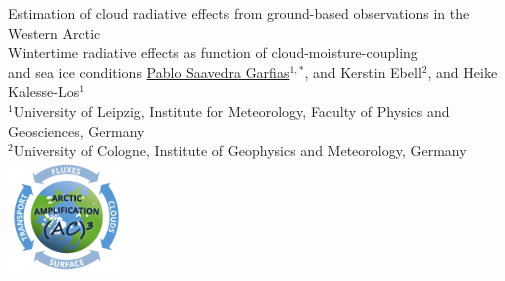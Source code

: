 \documentclass[portrate,paperwidth=841mm,paperheight=1189mm,fontscale=0.4,margin=1cm]{baposter}
\begin{document}
\begin{poster}
{      %
  }
  {\color{black}Estimation of cloud radiative effects from ground-based observations in the Western Arctic\\
  {\vspace{0.4em}\LARGE Wintertime radiative effects as function of cloud-moisture-coupling\\ and sea ice conditions}}
  {\vspace{+1em} \underline{Pablo Saavedra Garfias}$^{1,*}$, and Kerstin Ebell$^{2}$, and Heike Kalesse-Los$^1$\\
    $^1$University of Leipzig, Institute for Meteorology, Faculty of Physics and Geosciences, Germany\\
	$^2$University of Cologne, Institute of Geophysics and Meteorology, Germany
    }
  {%
      \includegraphics[height=8.0em]{logo_small-ac3.png}
  }

    \newcommand{\colouredcircle}{%
      \vspace{1em}\tikz{\useasboundingbox (-0.2em,-0.32em) rectangle(0.2em,0.32em); \draw[draw=black,fill=lightblue,line width=0.03em] (0,0) circle(0.28em);}\hspace{0.8em}}


\end{poster}
\end{document}
